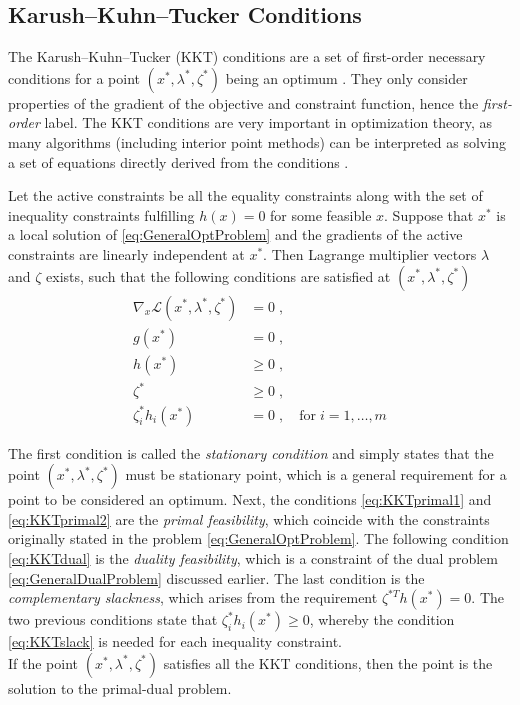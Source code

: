 \subsection{Karush–Kuhn–Tucker Conditions}
The Karush–Kuhn–Tucker (KKT) conditions are a set of first-order necessary conditions for a point $(x^*,\lambda^*,\zeta^*)$ being an optimum \cite{Kuhn2014}. They only consider properties of the gradient of the objective and constraint function, hence the \textit{first-order} label. The KKT conditions are very important in optimization theory, as many algorithms (including interior point methods) can be interpreted as solving a set of equations directly derived from the conditions \cite{wright}.    

\begin{theorem}
	Let the active constraints be all the equality constraints along with the set of inequality constraints fulfilling $h(x) = 0$ for some feasible $x$. Suppose that $x^*$ is a local solution of \eqref{eq:GeneralOptProblem} and the gradients of the active constraints are linearly independent at $x^*$. Then Lagrange multiplier vectors $\lambda$ and $\zeta$ exists, such that the following conditions are satisfied at $(x^*,\lambda^*,\zeta^*)$
\begin{subequations}	
\begin{align}
\nabla_x \mathcal{L}(x^*,\lambda^*,\zeta^*) &= 0 \; ,  	\\
g(x^*) &= 0 \; ,  \label{eq:KKTprimal1}					\\
h(x^*) &\geq 0 \; ,  \label{eq:KKTprimal2}				\\
\zeta^*  &\geq 0 \; , \label{eq:KKTdual}					\\ 
\zeta_{i}^* h_i (x^*) &= 0 \; , \quad \mathrm{for} \; i = 1 , \ldots , m \label{eq:KKTslack}
\end{align}
\label{eq:KKTconditions}
\end{subequations}	  
\end{theorem}
The first condition is called the \textit{stationary condition} and simply states that the point $(x^*,\lambda^*,\zeta^*)$ must be stationary point, which is a general requirement for a point to be considered an optimum. Next, the conditions \eqref{eq:KKTprimal1} and \eqref{eq:KKTprimal2} are the \textit{primal feasibility}, which coincide with the constraints originally stated in the problem \eqref{eq:GeneralOptProblem}. The following condition \eqref{eq:KKTdual} is the \textit{duality feasibility}, which is a constraint of the dual problem \eqref{eq:GeneralDualProblem} discussed earlier.
The last condition is the \textit{complementary slackness}, which arises from the requirement $\zeta^{*T} h(x^*) = 0$. The two previous conditions state that $\zeta_{i}^{*} h_i(x^*) \geq 0$, whereby the condition \eqref{eq:KKTslack} is needed for each inequality constraint.\\
If the point $(x^*,\lambda^*,\zeta^*)$ satisfies all the KKT conditions, then the point is the solution to the primal-dual problem.


